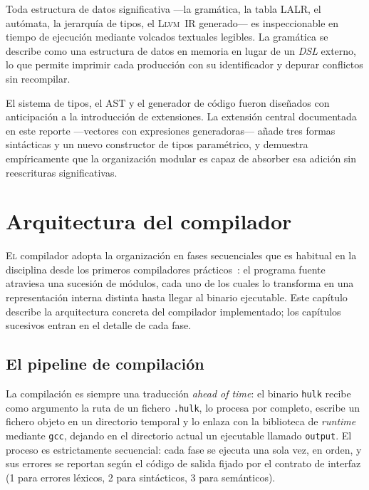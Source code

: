 \documentclass[11pt,a4paper,oneside,openany]{report}
\newcommand{\code}[1]{\texttt{#1}}
\newcommand{\llvm}{\textsc{Llvm}}
\begin{document}
\begin{description}[style=nextline,leftmargin=2.2em]
    Toda estructura de datos significativa ---la gramática, la tabla LALR, el
    autómata, la jerarquía de tipos, el \llvm{}~IR generado--- es inspeccionable
    en tiempo de ejecución mediante volcados textuales legibles. La gramática
    se describe como una estructura de datos en memoria en lugar de un
    \textit{DSL} externo, lo que permite imprimir cada producción con su
    identificador y depurar conflictos sin recompilar.
  \item[D5. Extensibilidad sintáctica y semántica.]
    El sistema de tipos, el AST y el generador de código fueron diseñados con
    anticipación a la introducción de extensiones. La extensión central
    documentada en este reporte ---vectores con expresiones generadoras---
    añade tres formas sintácticas y un nuevo constructor de tipos
    paramétrico, y demuestra empíricamente que la organización modular es
    capaz de absorber esa adición sin reescrituras significativas.
\end{description}


\chapter{Arquitectura del compilador}
\label{cap:arq}

\lettrine[lines=2,findent=2pt,nindent=0pt]{E}{l} compilador adopta la organización
en fases secuenciales que es habitual en la disciplina desde los primeros
compiladores prácticos~\cite{wirth1971,aho2006}: el programa fuente atraviesa
una sucesión de módulos, cada uno de los cuales lo transforma en una
representación interna distinta hasta llegar al binario ejecutable. Este
capítulo describe la arquitectura concreta del compilador implementado;
los capítulos sucesivos entran en el detalle de cada fase.

\section{El pipeline de compilación}

La compilación es siempre una traducción \textit{ahead of time}: el binario
\code{hulk} recibe como argumento la ruta de un fichero \texttt{.hulk}, lo
procesa por completo, escribe un fichero objeto en un directorio temporal
y lo enlaza con la biblioteca de \textit{runtime} mediante \code{gcc}, dejando
en el directorio actual un ejecutable llamado \code{output}. El proceso es
estrictamente secuencial: cada fase se ejecuta una sola vez, en orden, y
sus errores se reportan según el código de salida fijado por el contrato de
interfaz (1 para errores léxicos, 2 para sintácticos, 3 para semánticos).
\end{document}

